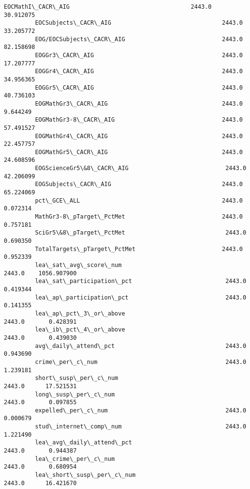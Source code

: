 \documentclass[11pt]{article}
\begin{document}
\begin{Verbatim}[commandchars=\\\{\}]
         EOCMathI\_CACR\_AIG                                   2443.0      30.912075   
         EOCSubjects\_CACR\_AIG                                2443.0      33.205772   
         EOG/EOCSubjects\_CACR\_AIG                            2443.0      82.158698   
         EOGGr3\_CACR\_AIG                                     2443.0      17.207777   
         EOGGr4\_CACR\_AIG                                     2443.0      34.956365   
         EOGGr5\_CACR\_AIG                                     2443.0      40.736103   
         EOGMathGr3\_CACR\_AIG                                 2443.0       9.644249   
         EOGMathGr3-8\_CACR\_AIG                               2443.0      57.491527   
         EOGMathGr4\_CACR\_AIG                                 2443.0      22.457757   
         EOGMathGr5\_CACR\_AIG                                 2443.0      24.608596   
         EOGScienceGr5\&8\_CACR\_AIG                            2443.0      42.206099   
         EOGSubjects\_CACR\_AIG                                2443.0      65.224069   
         pct\_GCE\_ALL                                         2443.0       0.072314   
         MathGr3-8\_pTarget\_PctMet                            2443.0       0.757181   
         SciGr5\&8\_pTarget\_PctMet                             2443.0       0.690350   
         TotalTargets\_pTarget\_PctMet                         2443.0       0.952339   
         lea\_sat\_avg\_score\_num                               2443.0    1056.907900   
         lea\_sat\_participation\_pct                           2443.0       0.419344   
         lea\_ap\_participation\_pct                            2443.0       0.141355   
         lea\_ap\_pct\_3\_or\_above                               2443.0       0.428391   
         lea\_ib\_pct\_4\_or\_above                               2443.0       0.439030   
         avg\_daily\_attend\_pct                                2443.0       0.943690   
         crime\_per\_c\_num                                     2443.0       1.239181   
         short\_susp\_per\_c\_num                                2443.0      17.521531   
         long\_susp\_per\_c\_num                                 2443.0       0.097855   
         expelled\_per\_c\_num                                  2443.0       0.000679   
         stud\_internet\_comp\_num                              2443.0       1.221490   
         lea\_avg\_daily\_attend\_pct                            2443.0       0.944387   
         lea\_crime\_per\_c\_num                                 2443.0       0.680954   
         lea\_short\_susp\_per\_c\_num                            2443.0      16.421670   

\end{Verbatim}
\end{document}
